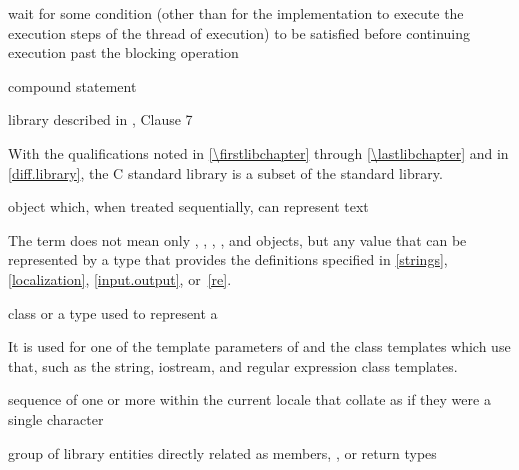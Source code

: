 %
wait for some condition (other than for the implementation to execute
the execution steps of the thread of execution) to be satisfied before
continuing execution past the blocking operation

%
compound statement

%
library described in \IsoC{}, Clause 7
\begin{defnote}
With the qualifications noted in \ref{\firstlibchapter}
through \ref{\lastlibchapter} and in \ref{diff.library},
the C standard library is a subset of the \Cpp{} standard library.
\end{defnote}

%
object which,
when treated sequentially,
can represent text

\begin{defnote}
The term does not mean only
,
,
,
,
and
objects,
but any value that can be represented by a type
that provides the definitions specified in
\ref{strings}, \ref{localization}, \ref{input.output}, or~\ref{re}.
\end{defnote}

%
class or a type used to
represent a 

\begin{defnote}
It is used for one of the template parameters of 
and the class templates which use that,
such as the string, iostream, and regular expression class templates.
\end{defnote}

%
sequence of one or more  within the
current locale that collate as if they were a single character

%
group of library entities directly related as members, , or
return types

